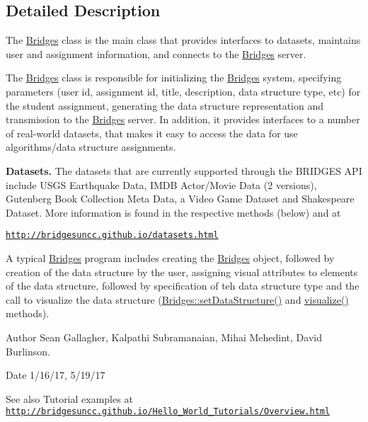 \subsection{Detailed Description}
The \mbox{\hyperlink{classbridges_1_1connect_1_1_bridges}{Bridges}} class is the main class that provides interfaces to datasets, maintains user and assignment information, and connects to the \mbox{\hyperlink{classbridges_1_1connect_1_1_bridges}{Bridges}} server. 

The \mbox{\hyperlink{classbridges_1_1connect_1_1_bridges}{Bridges}} class is responsible for initializing the \mbox{\hyperlink{classbridges_1_1connect_1_1_bridges}{Bridges}} system, specifying parameters (user id, assignment id, title, description, data structure type, etc) for the student assignment, generating the data structure representation and transmission to the \mbox{\hyperlink{classbridges_1_1connect_1_1_bridges}{Bridges}} server. In addition, it provides interfaces to a number of real-\/world datasets, that makes it easy to access the data for use algorithms/data structure assignments. ~\newline


{\bfseries Datasets.} The datasets that are currently supported through the B\+R\+I\+D\+G\+ES A\+PI include U\+S\+GS Earthquake Data, I\+M\+DB Actor/\+Movie Data (2 versions), Gutenberg Book Collection Meta Data, a Video Game Dataset and Shakespeare Dataset. More information is found in the respective methods (below) and at 

\href{http://bridgesuncc.github.io/datasets.html}{\tt http\+://bridgesuncc.\+github.\+io/datasets.\+html} 

A typical \mbox{\hyperlink{classbridges_1_1connect_1_1_bridges}{Bridges}} program includes creating the \mbox{\hyperlink{classbridges_1_1connect_1_1_bridges}{Bridges}} object, followed by creation of the data structure by the user, assigning visual attributes to elements of the data structure, followed by specification of teh data structure type and the call to visualize the data structure (\mbox{\hyperlink{classbridges_1_1connect_1_1_bridges_a921a6603b2445b1abe30a1b3d6f0c255}{Bridges\+::set\+Data\+Structure()}} and \mbox{\hyperlink{classbridges_1_1connect_1_1_bridges_a1853d64ffb8675ba2ec227a2b819cd24}{visualize()}} methods).

\begin{DoxyAuthor}{Author}
Sean Gallagher, Kalpathi Subramanaian, Mihai Mehedint, David Burlinson.
\end{DoxyAuthor}
\begin{DoxyDate}{Date}
1/16/17, 5/19/17
\end{DoxyDate}
\begin{DoxySeeAlso}{See also}
Tutorial examples at ~\newline
 \href{http://bridgesuncc.github.io/Hello_World_Tutorials/Overview.html}{\tt http\+://bridgesuncc.\+github.\+io/\+Hello\+\_\+\+World\+\_\+\+Tutorials/\+Overview.\+html} 
\end{DoxySeeAlso}


